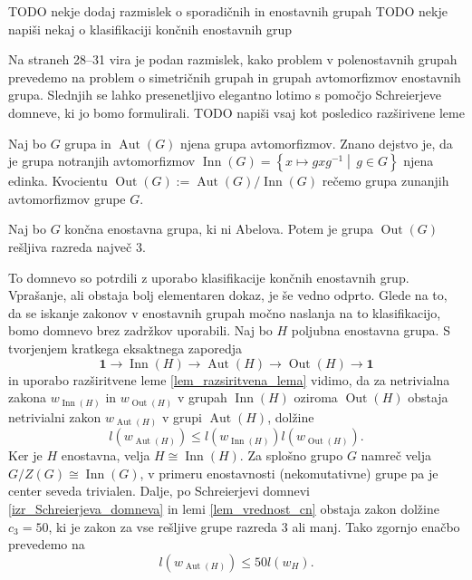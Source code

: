 \documentclass[mat1, tisk]{fmfdelo}
\numberwithin{equation}{section}  %
\begin{document}
TODO nekje dodaj razmislek o sporadičnih in enostavnih grupah
TODO nekje napiši nekaj o klasifikaciji končnih enostavnih grup

Na straneh 28--31 vira \cite{Schneider_2016} je podan razmislek, kako problem v polenostavnih grupah prevedemo na problem o simetričnih grupah in grupah avtomorfizmov enostavnih grupa. Slednjih se lahko presenetljivo elegantno lotimo s pomočjo Schreierjeve domneve, ki jo bomo formulirali.
TODO napiši vsaj kot posledico razširivene leme

\begin{definicija}
\label{def_grupa_zunanjih_avtomorfizmov}
Naj bo $G$ grupa in $\operatorname{Aut}(G)$ njena grupa avtomorfizmov. Znano dejstvo je, da je grupa notranjih avtomorfizmov $\operatorname{Inn}(G) = \left\{ x \mapsto g x g^{-1}  \middle|\,  g \in G  \right\}$ njena edinka.
Kvocientu $\operatorname{Out}(G) :=  \operatorname{Aut}(G)  /  \operatorname{Inn}(G)$ rečemo grupa zunanjih avtomorfizmov grupe $G$. 
\end{definicija}

\begin{izrek}
\label{izr_Schreierjeva_domneva}
 Naj bo $G$ končna enostavna grupa, ki ni Abelova. Potem je grupa $\operatorname{Out}(G)$ rešljiva razreda največ $3$.
\end{izrek}

To domnevo so potrdili z uporabo klasifikacije končnih enostavnih grup. Vprašanje, ali obstaja bolj elementaren dokaz, je še vedno odprto.
Glede na to, da se iskanje zakonov v enostavnih grupah močno naslanja na to klasifikacijo, bomo domnevo brez zadržkov uporabili. Naj bo $H$ poljubna enostavna grupa. 
S tvorjenjem kratkega eksaktnega zaporedja \begin{equation*}
    \mathbf{1} \to \operatorname{Inn}(H)  \to \operatorname{Aut}(H)  \to  \operatorname{Out}(H)  \to  \mathbf{1}
\end{equation*}  
in uporabo razširitvene leme \ref{lem_razsiritvena_lema} vidimo, da za netrivialna zakona $w_{\operatorname{Inn}(H) }$ in $w_{\operatorname{Out}(H) }$ v grupah $\operatorname{Inn}(H) $ oziroma $\operatorname{Out}(H) $ obstaja netrivialni zakon $w_{\operatorname{Aut}(H) }$ v grupi $\operatorname{Aut}(H) $, dolžine \begin{equation*}
    l(w_{\operatorname{Aut}(H) }) \le  l(w_{\operatorname{Inn}(H) }) l (w_{ \operatorname{Out}(H) }).
    \end{equation*}    
Ker je $H$ enostavna, velja $H \cong \operatorname{Inn}(H)$. Za splošno grupo $G$ namreč velja $ G / Z(G) \cong \operatorname{Inn}(G)$, v primeru enostavnosti (nekomutativne) grupe pa je center seveda trivialen. Dalje, po Schreierjevi domnevi \ref{izr_Schreierjeva_domneva} in lemi \ref{lem_vrednost_cn} obstaja zakon dolžine $c_3 = 50$, ki je zakon za vse rešljive grupe razreda $3$ ali manj.
Tako zgornjo enačbo prevedemo na \begin{equation*}
    l(w_{\operatorname{Aut}(H) }) \le  50 l(w_H).
\end{equation*}  
\end{document}
